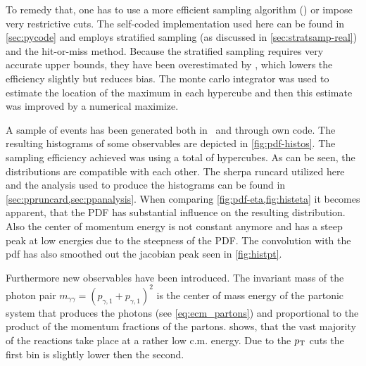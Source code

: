To remedy that, one has to use a more efficient sampling algorithm
(\vegas) or impose very restrictive cuts. The self-coded
implementation used here can be found in \cref{sec:pycode} and employs
stratified sampling (as discussed in \cref{sec:stratsamp-real}) and
the hit-or-miss method. Because the stratified sampling requires very
accurate upper bounds, they have been overestimated by
, which lowers the efficiency
slightly but reduces bias. The monte carlo integrator was used to
estimate the location of the maximum in each hypercube and then this
estimate was improved by a numerical maximize.

A sample of  events has been
generated both in \sherpa\ and through own code. The resulting
histograms of some observables are depicted in
\cref{fig:pdf-histos}. The sampling efficiency achieved was
 using a total of
 hypercubes.  As can be seen, the
distributions are compatible with each other. The sherpa runcard
utilized here and the analysis used to produce the histograms can be
found in \cref{sec:ppruncard,sec:ppanalysis}. When comparing
\cref{fig:pdf-eta,fig:histeta} it becomes apparent, that the PDF has
substantial influence on the resulting distribution. Also the center
of momentum energy is not constant anymore and has a steep peak at low
energies due to the steepness of the PDF. The convolution with the pdf
has also smoothed out the jacobian peak seen in \cref{fig:histpt}.

Furthermore new observables have been introduced.  The invariant mass
of the photon pair
\(m_{\gamma\gamma} = (p_{\gamma,1} + p_{\gamma,1})^2\) is the center
of mass energy of the partonic system that produces the photons (see
\cref{eq:ecm_partons}) and proportional to the product of the momentum
fractions of the partons.  shows, that the vast
majority of the reactions take place at a rather low c.m. energy. Due
to the \(p_\mathrm{T}\) cuts the first bin is slightly lower then the second.

